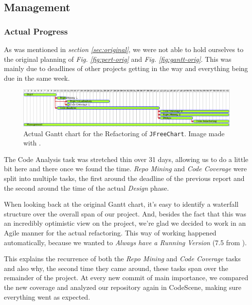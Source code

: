 \documentclass[11pt]{article}
\begin{document}
	\subsection{Management}
	\label{sec:management2}
	\subsubsection{Actual Progress}
	As was mentioned in \textsl{section \ref{sec:original}}, we were not able to hold ourselves to the original planning of \textsl{Fig. \ref{fig:pert-orig}} and \textsl{Fig. \ref{fig:gantt-orig}}. This was mainly due to deadlines of other projects getting in the way and everything being due in the same week.
	
	\begin{figure}[H] 
		\centering 
		\includegraphics[width=\textwidth]{pictures/gantt-actual.png}
		\caption{Actual \textsf{Gantt} chart for the Refactoring of \texttt{JFreeChart}. Image made with \cite{plantuml}.} 
		\label{fig:gantt-actual} 
	\end{figure}

	The \textsf{Code Analysis} task was stretched thin over 31 days, allowing us to do a little bit here and there once we found the time. \textsl{Repo Mining} and \textsl{Code Coverage} were split into multiple tasks, the first around the deadline of the previous report and the second around the time of the actual \textsl{Design} phase.
	
	When looking back at the original \textsf{Gantt} chart, it's easy to identify a waterfall structure over the overall span of our project. And, besides the fact that this was an incredibly optimistic view on the project, we're glad we decided to work in an \textsf{Agile} manner for the actual refactoring. This way of working happened automatically, because we wanted to \textsl{Always have a Running Version} (7.5 from \cite{demeyer2009object}).
	
	This explains the recurrence of both the \textsl{Repo Mining} and \textsl{Code Coverage} tasks and also why, the second time they came around, these tasks span over the remainder of the project. At every new commit of main importance, we compared the new coverage and analyzed our repository again in \textsf{CodeScene}, making sure everything went as expected.
	
\end{document}
